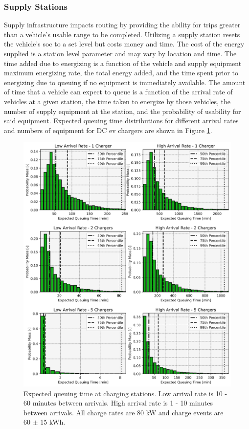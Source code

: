 \documentclass[11pt]{article}
\begin{document}
\begin{multicols}{2}
\subsubsection*{Supply Stations}

Supply infrastructure impacts routing by providing the ability for trips greater than a vehicle's usable range to be completed. Utilizing a supply station resets the vehicle's \gls{soc} to a set level but costs money and time. The cost of the energy supplied is a station level parameter and may vary by location and time. The time added due to energizing is a function of the vehicle and supply equipment maximum energizing rate, the total energy added, and the time spent prior to energizing due to queuing if no equipment is immediately available. The amount of time that a vehicle can expect to queue is a function of the arrival rate of vehicles at a given station, the time taken to energize by those vehicles, the number of supply equipment at the station, and the probability of usability for said equipment. Expected queuing time distributions for different arrival rates and numbers of equipment for DC \gls{ev} chargers are shown in Figure \ref{fig:expected_delay}.

\begin{figure}[H]
	\centering
	\includegraphics[width = \linewidth]{figs/expected_delay.png}
	\caption{Expected queuing time at charging stations. Low arrival rate is 10 - 60 minutes between arrivals. High arrival rate is 1 - 10 minutes between arrivals. All charge rates are 80 kW and charge events are 60 $\pm$ 15 kWh.}
	\label{fig:expected_delay}
\end{figure}


\end{multicols}
\end{document}
